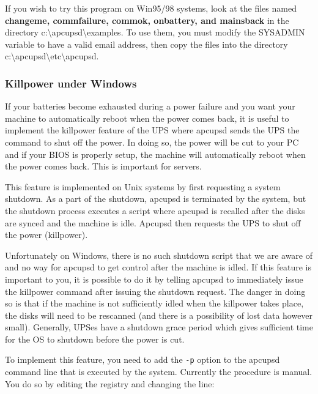 {{{{{{{{{{If you wish to try this program on Win95/98 systems, look at the files named
{\bf changeme, commfailure, commok, onbattery, and mainsback} in the directory
c:\textbackslash{}apcupsd\textbackslash{}examples. To use them, you must
modify the SYSADMIN variable to have a valid email address, then copy the
files into the directory
c:\textbackslash{}apcupsd\textbackslash{}etc\textbackslash{}apcupsd. 

\label{Killpower-under-Windows}

\subsubsection*{Killpower under Windows}

\label{index-Windows_002c-Killpower-183}
If your batteries become exhausted during a power failure and you want your
machine to automatically reboot when the power comes back, it is useful to
implement the killpower feature of the UPS where apcupsd sends the UPS the
command to shut off the power.  In doing so, the power will be cut to your PC
and if your BIOS is properly setup, the machine will automatically reboot when
the power comes back. This is important for servers.  

This feature is implemented on Unix systems by first requesting a system
shutdown. As a part of the shutdown, apcupsd is terminated by the system, but
the shutdown process executes a script where apcupsd is recalled after the
disks are synced and the machine is idle. Apcupsd then requests the UPS to
shut off the power (killpower).  

Unfortunately on Windows, there is no such shutdown script that we are aware
of and no way for apcupsd to get control after the machine is idled. If this
feature is important to you, it is possible to do it by telling apcupsd to
immediately issue the killpower command after issuing the shutdown request.
The danger in doing so is that if the machine is not sufficiently idled when
the killpower takes place, the disks will need to be rescanned (and there is a
possibility of lost data however small). Generally, UPSes have a shutdown
grace period which gives sufficient time for the OS to shutdown before the
power is cut.  

To implement this feature, you need to add the {\tt -p} option to the apcupsd
command line that is executed by the system.  Currently the procedure is
manual. You do so by editing the registry and changing the line: 

}}}}}}}}}}
